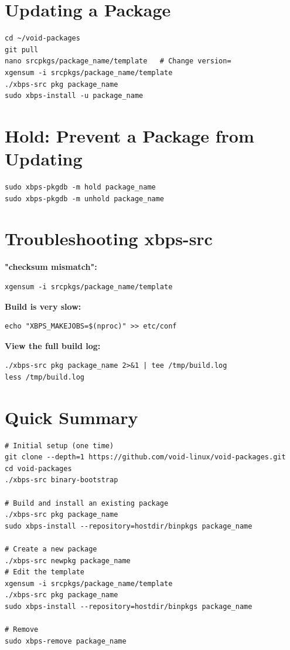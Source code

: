 \documentclass[12pt, a4paper]{book}
\begin{document}
\section{Updating a Package}
\begin{lstlisting}
cd ~/void-packages
git pull
nano srcpkgs/package_name/template   # Change version=
xgensum -i srcpkgs/package_name/template
./xbps-src pkg package_name
sudo xbps-install -u package_name
\end{lstlisting}

\section{Hold: Prevent a Package from Updating}
\begin{lstlisting}
sudo xbps-pkgdb -m hold package_name
sudo xbps-pkgdb -m unhold package_name
\end{lstlisting}

\section{Troubleshooting xbps-src}

\textbf{"checksum mismatch":}
\begin{lstlisting}
xgensum -i srcpkgs/package_name/template
\end{lstlisting}

\textbf{Build is very slow:}
\begin{lstlisting}
echo "XBPS_MAKEJOBS=$(nproc)" >> etc/conf
\end{lstlisting}

\textbf{View the full build log:}
\begin{lstlisting}
./xbps-src pkg package_name 2>&1 | tee /tmp/build.log
less /tmp/build.log
\end{lstlisting}

\section{Quick Summary}
\begin{lstlisting}
# Initial setup (one time)
git clone --depth=1 https://github.com/void-linux/void-packages.git
cd void-packages
./xbps-src binary-bootstrap

# Build and install an existing package
./xbps-src pkg package_name
sudo xbps-install --repository=hostdir/binpkgs package_name

# Create a new package
./xbps-src newpkg package_name
# Edit the template
xgensum -i srcpkgs/package_name/template
./xbps-src pkg package_name
sudo xbps-install --repository=hostdir/binpkgs package_name

# Remove
sudo xbps-remove package_name
\end{lstlisting}
\end{document}
